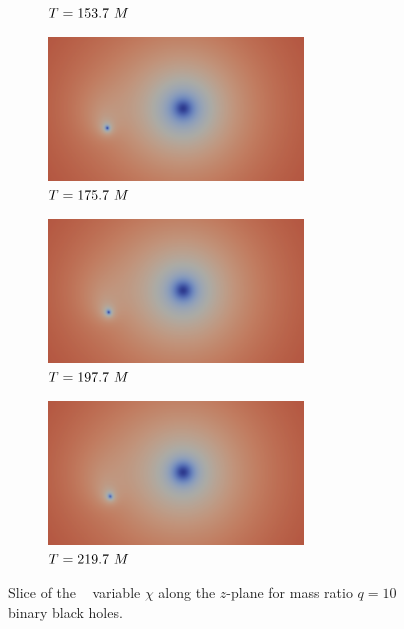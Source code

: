 \documentclass[landscape]{a0poster}
\begin{document}
\begin{textblock}{62}
\begin{textblock}{38}
\begin{figure}
\begin{subfigure}{0.0714\textwidth}
			\caption{\small ${T}=153.7~M$}
		\end{subfigure}
		\begin{subfigure}{0.0714\textwidth}
			\centering
			\includegraphics[height=1.5in]{figs/AE/r10/img_slice_000080.png}
			\caption{\small ${T}=175.7~M$}
		\end{subfigure}
		\begin{subfigure}{0.0714\textwidth}
			\centering
			\includegraphics[height=1.5in]{figs/AE/r10/img_slice_000090.png}
			\caption{\small ${T}=197.7~M$}
		\end{subfigure}
		\begin{subfigure}{0.0714\textwidth}
			\centering
			\includegraphics[height=1.5in]{figs/AE/r10/img_slice_000100.png}
			\caption{\small ${T}=219.7~M$}
		\end{subfigure}
		\caption{Slice of the \BSSN~ variable $\chi$ along the $z$-plane for mass ratio $q=10$ binary black holes.}
	\end{figure}
\end{textblock}


\end{textblock}
\end{document}
